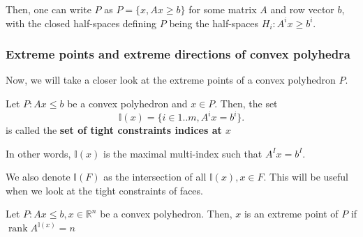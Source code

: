 Then, one can write \( P \) as \( P = \{x, Ax \ge  b\}   \) for some matrix \( A
\) and row vector \( b \), with the closed half-spaces defining \( P \) being
the half-spaces \( H_{i}: A^{i}x \ge  b^{i} \).

\subsubsection{Extreme points and extreme directions of convex polyhedra} %
\label{sec:Extreme points and extreme directions of convex polyhedra}

Now, we will take a closer look at the extreme points of a convex polyhedron \(
P\).

\begin{definition}
\label{def:Tight constraints}
Let \( P: Ax \le  b \) be a convex polyhedron and \( x \in P \). Then, the set
\[
  \mathbb{I}(x) = \{i \in 1..m, A^{i}x = b^{i}\}  
.\] is called the \textbf{set of tight constraints indices at \( x \)}

In other words, \( \mathbb{I}(x) \) is the maximal multi-index such that \(
A^{I}x = b^{I} \).
\end{definition}

We also denote \( \mathbb{I}(F) \) as the intersection of all \( \mathbb{I}(x), x \in F
\). This will be useful when we look at the tight constraints of faces.

\begin{theorem}
\label{thr:Extreme point of convex polyhedra and matrix rank}
  Let \( P: Ax \le  b, x \in \mathbb{R}^{n} \) be a convex polyhedron.
  Then, \( x \) is an extreme
  point of \( P \) if \( \operatorname{rank} A^{\mathbb{I}(x)} = n \)
\end{theorem}

